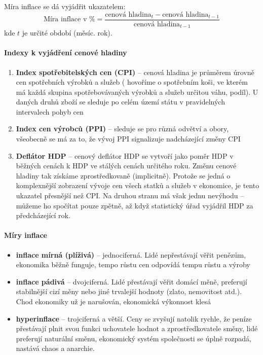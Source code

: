 Míra inflace se dá vyjádřit ukazatelem:
\begin{displaymath}
    \text{Míra inflace v \%} = \frac{\text{cenová hladina}_t - \text{cenová hladina}_{t - 1}}{\text{cenová hladina}_{t - 1}}
\end{displaymath}
kde $t$ je určité období (měsíc. rok).

\paragraph{Indexy k vyjádření cenové hladiny}
\begin{enumerate}
    \item \textbf{Index spotřebitelských cen (CPI)} -- cenová hladina je průměrem úrovně cen spotřebních výrobků a služeb ( hovoříme o spotřebním koši, ve kterém má každá skupina spotřebovávaných výrobků a služeb určitou váhu, podíl). U daných druhů zboží se sleduje po celém území státu v pravidelných intervalech pohyb cen
    \item \textbf{Index cen výrobců (PPI)} -- sleduje se pro různá odvětví a obory, všeobecně se má za to, že vývoj PPI signalizuje nadcházející změny CPI
    \item \textbf{Deflátor HDP} -- cenový deflátor HDP se vytvoří jako poměr HDP v běžných cenách k HDP ve stálých cenách určitého roku. Změnu cenové hladiny tak získáme zprostředkovaně (implicitně). Protože se jedná o komplexnější zobrazení vývoje cen všech statků a služeb v ekonomice, je tento ukazatel přesnější než CPI. Na druhou stranu má však jednu nevýhodu -- můžeme ho spočítat pouze zpětně, až když statistický úřad vyjádřil HDP za předcházející rok.
\end{enumerate}

\paragraph{Míry inflace}
\begin{itemize}
    \item \textbf{inflace mírná (plíživá)} -- jednociferná. Lidé nepřestávají věřit penězům, ekonomika běžně funguje, tempo růstu cen odpovídá tempu růstu a výroby
    \item \textbf{inflace pádivá} -- dvojciferná. Lidé přestávají věřit domácí měně, preferují stabilnější cizí měny nebo jiné trvalejší hodnoty (zlato, nemovitost atd.). Chod ekonomiky už je narušován, ekonomická výkonnost klesá
    \item \textbf{hyperinflace} -- trojciferná a větší. Ceny se zvyšují natolik rychle, že peníze přestávají plnit svou funkci uchovatele hodnot a zprostředkovatele směny, lidé preferují naturální směnu, ekonomický systém společnosti se úplně rozpadá, nastává chaos a anarchie.
\end{itemize}

